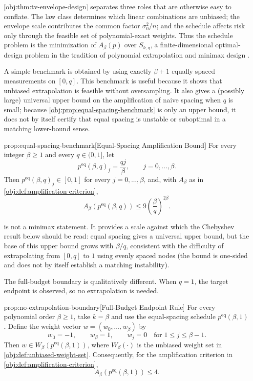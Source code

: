 \documentclass[11pt]{article}
\begin{document}
\cref{obj:thm:tv-envelope-design} separates three roles that are otherwise easy to conflate. The law class determines which linear combinations are unbiased; the envelope scale contributes the common factor \(\sigma_0^2/n\); and the schedule affects risk only through the feasible set of polynomial-exact weights. Thus the schedule problem is the minimization of \(A_\beta(p)\) over \(S_{k,q}\), a finite-dimensional optimal-design problem in the tradition of polynomial extrapolation and minimax design \citep{smith1918,kiefer1959,kiefer1974,pukelsheim1993,karlin1966}.

A simple benchmark is obtained by using exactly \(\beta+1\) equally spaced measurements on \([0,q]\). This benchmark is useful because it shows that unbiased extrapolation is feasible without oversampling. It also gives a (possibly large) universal upper bound on the amplification of naive spacing when \(q\) is small; because \cref{obj:prop:equal-spacing-benchmark} is only an upper bound, it does not by itself certify that equal spacing is unstable or suboptimal in a matching lower-bound sense.

\begin{propositionv}{prop:equal-spacing-benchmark}[Equal-Spacing Amplification Bound]
For every integer $\beta\ge 1$ and every $q\in(0,1]$, let
\[
p^{\mathrm{eq}}(\beta,q)_j=\frac{qj}{\beta},
\qquad j=0,\ldots,\beta .
\]
Then $p^{\mathrm{eq}}(\beta,q)_j\in[0,1]$ for every $j=0,\ldots,\beta$, and, with $A_\beta$ as in \cref{obj:def:amplification-criterion},
\[
A_\beta\!\left(p^{\mathrm{eq}}(\beta,q)\right)
\le
9\left(\frac{\beta}{q}\right)^{2\beta}.
\]
\end{propositionv}

 is not a minimax statement. It provides a scale against which the Chebyshev result below should be read: equal spacing gives a universal upper bound, but the base of this upper bound grows with \(\beta/q\), consistent with the difficulty of extrapolating from \([0,q]\) to \(1\) using evenly spaced nodes (the bound is one-sided and does not by itself establish a matching instability).

The full-budget boundary is qualitatively different. When \(q=1\), the target endpoint is observed, so no extrapolation is needed.

\begin{propositionv}{prop:no-extrapolation-boundary}[Full-Budget Endpoint Rule]
For every polynomial order \(\beta\ge 1\), take \(k=\beta\) and use the equal-spacing schedule \(p^{\mathrm{eq}}(\beta,1)\). Define the weight vector \(w=(w_0,\ldots,w_\beta)\) by
\[
w_0=-1,\qquad w_\beta=1,\qquad w_j=0 \quad\text{for } 1\le j\le \beta-1 .
\]
Then \(w\in W_\beta(p^{\mathrm{eq}}(\beta,1))\), where \(W_\beta(\cdot)\) is the unbiased weight set in \cref{obj:def:unbiased-weight-set}. Consequently, for the amplification criterion in \cref{obj:def:amplification-criterion},
\[
A_\beta\!\left(p^{\mathrm{eq}}(\beta,1)\right)\le 4 .
\]
\end{propositionv}
\end{document}
